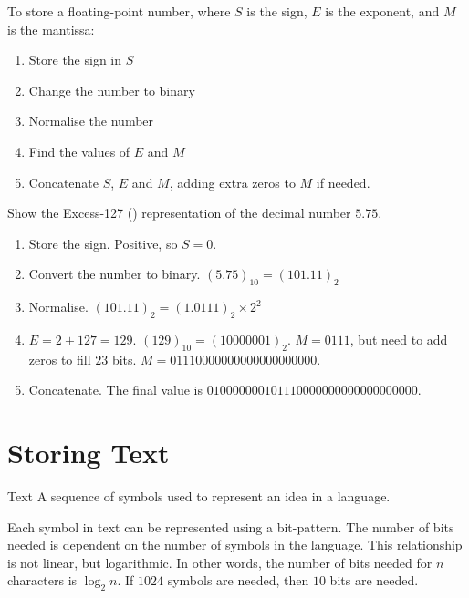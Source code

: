 \documentclass[../notes.tex]{subfiles}
\begin{document}
				To store a floating-point number, where $S$ is the sign, $E$ is the exponent, and $M$ is the mantissa:
				\begin{enumerate}[nosep]
					\item Store the sign in $S$
					\item Change the number to binary
					\item Normalise the number
					\item Find the values of $E$ and $M$
					\item Concatenate $S$, $E$ and $M$, adding extra zeros to $M$ if needed.
				\end{enumerate}
				\pagebreak
				\begin{example}
					Show the Excess-127 () representation of the decimal number $5.75$.
					\begin{enumerate}
						\item Store the sign. Positive, so $S = 0$.
						\item Convert the number to binary. $(5.75)_{10} = (101.11)_{2}$
						\item Normalise. $(101.11)_{2} = (1.0111)_{2} \times 2^{2}$
						\item $E = 2 + 127 = 129$. $(129)_{10} = (10000001)_{2}$. $M = 0111$, but need to add zeros to fill $23$ bits. $M = 01110000000000000000000$.
						\item Concatenate. The final value is $010000000101110000000000000000000$.
					\end{enumerate}
				\end{example}
		\section{Storing Text}
			\begin{definition}{Text}
				A sequence of symbols used to represent an idea in a language.
			\end{definition}
			Each symbol in text can be represented using a bit-pattern. The number of bits needed is dependent on the number of symbols in the language. This relationship is not linear, but logarithmic. In other words, the number of bits needed for $n$ characters is $\log_{2}n$. If $1024$ symbols are needed, then $10$ bits are needed.
\end{document}
